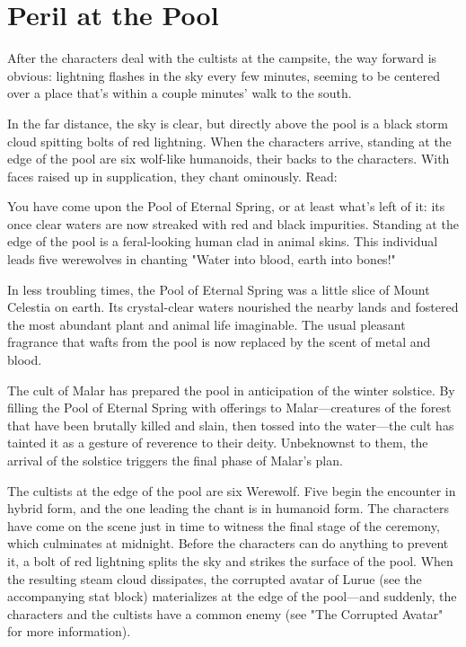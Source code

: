 \documentclass[10pt,a4paper,twoside,bg=print,twocolumn,openany,nodeprecatedcode]{dndbook}
\begin{document}
\section{Peril at the Pool}
After the characters deal with the cultists at the campsite, the way forward is obvious: lightning flashes in the sky every few minutes, seeming to be centered over a place that's within a couple minutes' walk to the south.

In the far distance, the sky is clear, but directly above the pool is a black storm cloud spitting bolts of red lightning. When the characters arrive, standing at the edge of the pool are six wolf-like humanoids, their backs to the characters. With faces raised up in supplication, they chant ominously. Read:

\begin{DndReadAloud}{}
You have come upon the Pool of Eternal Spring, or at least what's left of it: its once clear waters are now streaked with red and black impurities. Standing at the edge of the pool is a feral-looking human clad in animal skins. This individual leads five werewolves in chanting "Water into blood, earth into bones!"

\end{DndReadAloud}

In less troubling times, the Pool of Eternal Spring was a little slice of Mount Celestia on earth. Its crystal-clear waters nourished the nearby lands and fostered the most abundant plant and animal life imaginable. The usual pleasant fragrance that wafts from the pool is now replaced by the scent of metal and blood.

The cult of Malar has prepared the pool in anticipation of the winter solstice. By filling the Pool of Eternal Spring with offerings to Malar—creatures of the forest that have been brutally killed and slain, then tossed into the water—the cult has tainted it as a gesture of reverence to their deity. Unbeknownst to them, the arrival of the solstice triggers the final phase of Malar's plan.

The cultists at the edge of the pool are six Werewolf. Five begin the encounter in hybrid form, and the one leading the chant is in humanoid form. The characters have come on the scene just in time to witness the final stage of the ceremony, which culminates at midnight. Before the characters can do anything to prevent it, a bolt of red lightning splits the sky and strikes the surface of the pool. When the resulting steam cloud dissipates, the corrupted avatar of Lurue (see the accompanying stat block) materializes at the edge of the pool—and suddenly, the characters and the cultists have a common enemy (see "The Corrupted Avatar" for more information).
\end{document}
